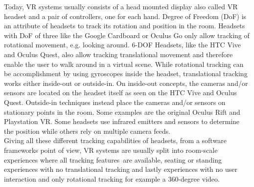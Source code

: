 Today, VR systems usually consists of a head mounted display also called VR headset and a pair of controllers, one for each hand. 
Degree of Freedom (DoF) is an attribute of headsets to track its rotation and position in the room. Headsets with DoF of three like the Google Cardboard or Oculus Go only allow tracking of rotational movement, e.g. looking around. 6-DOF Headsets, like the HTC Vive and Oculus Quest, also allow tracking translational movement and therefore enable the user to walk around in a virtual scene. 
While rotational tracking can be accomplishment by using gyroscopes inside the headset, translational tracking works either inside-out or outside-in. On inside-out concepts, the cameras and/or sensors are located on the headset itself as seen on the HTC Vive and Oculus Quest. Outside-in techniques instead place the cameras and/or sensors on stationary points in the room. Some examples are the original Oculus Rift and Playstation VR.
Some headsets use infrared emitters and sensors to determine the position while others rely on multiple camera feeds.\\
Giving all these different tracking capabilities of headsets, from a software frameworks point of view, VR systems are usually split into room-scale experiences where all tracking features are available, seating or standing experiences with no translational tracking and lastly experiences with no user interaction and only rotational tracking for example a 360-degree video.